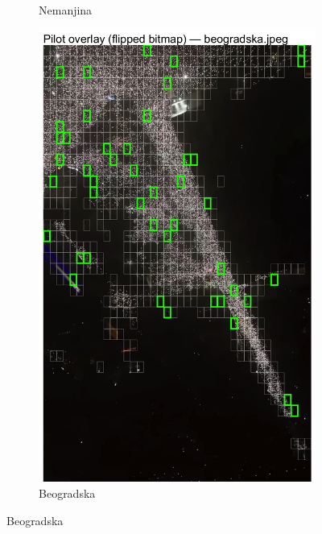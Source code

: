 \documentclass[a4paper,12pt]{article}
\begin{document}
\begin{figure}[H]
\begin{subfigure}[b]{0.3\textwidth}
	  \caption{Nemanjina}
	  \label{fig:nemanjina}
	\end{subfigure}
	\hfill
	\begin{subfigure}[b]{0.3\textwidth}
		\centering
		\includegraphics[width=\textwidth]{../outputs/sampling_outputs/plot_overlays_image/pilot_overlay_beogradska.png}
		\caption{Beogradska}
		\label{fig:beogradska}
	\end{subfigure}
  
	\vspace{0.3cm} %
  

\end{figure}
\end{document}
